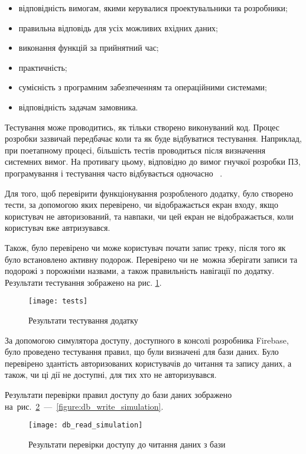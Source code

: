 \documentclass[../main.tex]{subfiles}
\begin{document}
\begin{itemize}[label={--}]
	\item відповідність вимогам, якими керувалися проектувальники та розробники;
	\item правильна відповідь для усіх можливих вхідних даних;
	\item виконання функцій за прийнятний час;
	\item практичність;
	\item сумісність з програмним забезпеченням та операційними системами;
	\item відповідність задачам замовника.
\end{itemize}

Тестування може проводитись, як тільки створено виконуваний код. Процес розробки зазвичай передбачає коли та як буде відбуватися тестування. Наприклад, при поетапному процесі, більшість тестів проводиться після визначення системних вимог. На противагу цьому, відповідно до вимог гнучкої розробки ПЗ, програмування і тестування часто відбувається одночасно~\cite{testing} .

Для того, щоб перевірити функціонування розробленого додатку, було створено тести, за допомогою яких перевірено, чи відображається екран входу, якщо користувач не авторизований, та навпаки, чи цей екран не відображається, коли користувач вже автризувався. 

Також, було перевірено чи може користувач почати запис треку, після того як було встановлено активну подорож. Перевірено чи не~можна зберігати записи та подорожі з порожніми назвами, а також правильність навігації по додатку. Результати тестування зображено на рис. \ref{figure:test_results}.

\begin{figure}[H]
	\centering
	\texttt{[image: tests]}
	\caption{Результати тестування додатку}
	\label{figure:test_results}
\end{figure}

За допомогою симулятора доступу, доступного в консолі розробника Firebase, було проведено тестування правил, що були визначені для бази даних. Було перевірено здантість авторизованих користувачів до читання та запису даних, а також, чи ці дії не доступні, для тих хто не авторизувався. 

Результати перевірки правил доступу до бази даних зображено на~рис.~\ref{figure:db_read_simulation}~—~\ref{figure:db_write_simulation}.

\begin{figure}[H]
	\centering
	\texttt{[image: db\_read\_simulation]}
	\caption{Результати перевірки доступу до читання даних з бази}
	\label{figure:db_read_simulation}
\end{figure}
\end{document}
